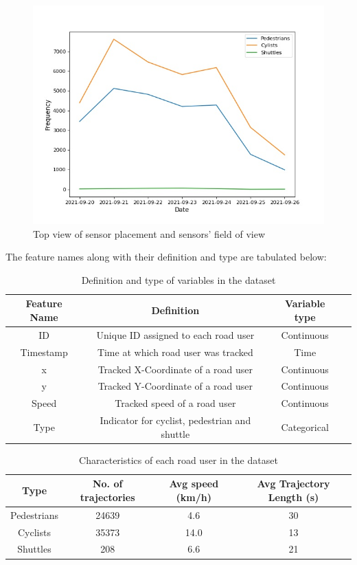 \documentclass{article}
\begin{document}
\begin{figure}[H]
\centering
\includegraphics[scale=0.3]{data/Data_6.jpg}
\caption{Top view of sensor placement and sensors' field of view}
\end{figure}



The feature names along with their definition and type are tabulated below:
\begin{table}[H]
\begin{center}
\begin{tabular}{ cccc } 
\hline
Feature Name & Definition & Variable type\\
\hline
ID & Unique ID assigned to each road user & Continuous\\ 
Timestamp & Time at which road user was tracked & Time\\ 
x & Tracked X-Coordinate of a road user & Continuous\\
y & Tracked Y-Coordinate of a road user & Continuous \\
Speed & Tracked speed of a road user&Continuous \\
Type & Indicator for cyclist, pedestrian and shuttle & Categorical\\
\hline
\end{tabular}
\caption{\label{tab:features}Definition and type of variables in the dataset}
\end{center}
\end{table}


\begin{table}[H]
\begin{center}
\begin{tabular}{ cccc } 
\hline
Type & No. of trajectories & Avg speed (km/h) & Avg Trajectory Length (s)\\
\hline
Pedestrians & 24639 & 4.6 &30\\ 
Cyclists & 35373 & 14.0 &13\\ 
Shuttles & 208 & 6.6 &21\\
\hline
\end{tabular}
\caption{\label{tab:road-user}Characteristics of each road user in the dataset}
\end{center}
\end{table}
\end{document}
